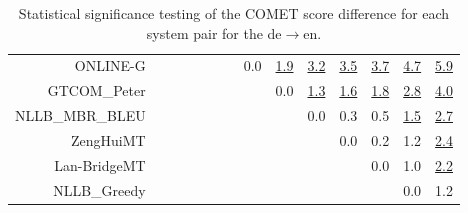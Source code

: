 \documentclass[11pt]{article}
\begin{document}
\begin{sidewaystable}
\begin{center}
{\begin{tabular}{rccccccccccccc}
ONLINE-G &  &  &  &  &  &  & \cellcolor{red!0} 0.0 & \cellcolor{red!70} \underline{1.9} & \cellcolor{red!70} \underline{3.2} & \cellcolor{red!70} \underline{3.5} & \cellcolor{red!70} \underline{3.7} & \cellcolor{red!70} \underline{4.7} & \cellcolor{red!70} \underline{5.9}\\ 
GTCOM\_Peter &  &  &  &  &  &  &  & \cellcolor{red!0} 0.0 & \cellcolor{red!70} \underline{1.3} & \cellcolor{red!70} \underline{1.6} & \cellcolor{red!70} \underline{1.8} & \cellcolor{red!70} \underline{2.8} & \cellcolor{red!70} \underline{4.0}\\ 
NLLB\_MBR\_BLEU &  &  &  &  &  &  &  &  & \cellcolor{red!0} 0.0 & \cellcolor{red!0} 0.3 & \cellcolor{red!0} 0.5 & \cellcolor{red!70} \underline{1.5} & \cellcolor{red!70} \underline{2.7}\\ 
ZengHuiMT &  &  &  &  &  &  &  &  &  & \cellcolor{red!0} 0.0 & \cellcolor{red!0} 0.2 & \cellcolor{red!50} 1.2 & \cellcolor{red!70} \underline{2.4}\\ 
Lan-BridgeMT &  &  &  &  &  &  &  &  &  &  & \cellcolor{red!0} 0.0 & \cellcolor{red!40} 1.0 & \cellcolor{red!70} \underline{2.2}\\ 
NLLB\_Greedy &  &  &  &  &  &  &  &  &  &  &  & \cellcolor{red!0} 0.0 & \cellcolor{red!60} 1.2\\ 
\bottomrule 
\end{tabular} }
\caption{Statistical significance testing of the COMET score difference for each system pair for the de$\rightarrow$en.} 
 \end{center} \end{sidewaystable} 
\end{document}
